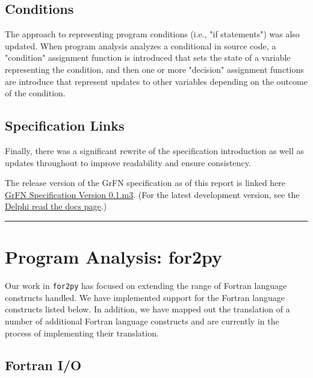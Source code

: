 \documentclass[article, 12pt, oneside]{memoir}
\begin{document}
\hypertarget{conditions}{%
\subsection{Conditions}\label{conditions}}

The approach to representing program conditions (i.e., "if statements")
was also updated. When program analysis analyzes a conditional in source
code, a "condition" assignment function is introduced that sets the
state of a variable representing the condition, and then one or more
"decision" assignment functions are introduce that represent updates to
other variables depending on the outcome of the condition.

\hypertarget{specification-links}{%
\subsection{Specification Links}\label{specification-links}}

Finally, there was a significant rewrite of the specification
introduction as well as updates throughout to improve readability and
ensure consistency.

The release version of the GrFN specification as of this report is
linked here \href{GrFN_specification_v0.1.m3}{GrFN Specification Version
0.1.m3}. (For the latest development version, see the
\href{https://delphi.readthedocs.io/en/master/grfn_spec.html}{Delphi
read the docs page}.)

\begin{center}\rule{0.5\linewidth}{\linethickness}\end{center}

\hypertarget{program-analysis-for2py}{%
\section{Program Analysis: for2py}\label{program-analysis-for2py}}

Our work in \texttt{for2py} has focused on extending the range of
Fortran language constructs handled. We have implemented support for the
Fortran language constructs listed below. In addition, we have mapped
out the translation of a number of additional Fortran language
constructs and are currently in the process of implementing their
translation.

\hypertarget{fortran-io}{%
\subsection{Fortran I/O}\label{fortran-io}}
\end{document}
